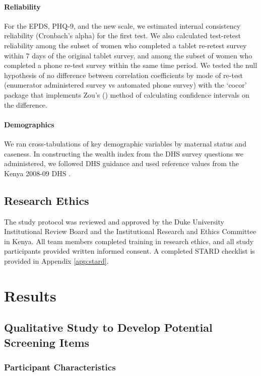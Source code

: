 \documentclass[man,natbib,longtable]{apa6}\usepackage[]{graphicx}\usepackage[]{color}
\begin{document}
\paragraph{Reliability}

For the EPDS, PHQ-9, and the new scale, we estimated internal consistency reliability (Cronbach's alpha) for the first test. We also calculated test-retest reliability among the subset of women who completed a tablet re-retest survey within 7 days of the original tablet survey, and among the subset of women who completed a phone re-test survey within the same time period. We tested the null hypothesis of no difference between correlation coefficients by mode of re-test (enumerator administered survey vs automated phone survey) with the `cocor' \citep{Diedenhofen:2015} package that implements Zou's (\citeyear{Zou:2007}) method of calculating confidence intervals on the difference.

\paragraph{Demographics}

We ran cross-tabulations of key demographic variables by maternal status and caseness. In constructing the wealth index from the DHS survey questions we administered, we followed DHS guidance and used reference values from the Kenya 2008-09 DHS \citep{DHSWI}.

\subsection{Research Ethics}

The study protocol was reviewed and approved by the Duke University Institutional Review Board and the Institutional Research and Ethics Committee in Kenya. All team members completed training in research ethics, and all study participants provided written informed consent. A completed STARD checklist is provided in Appendix \ref{app:stard}.

\section{Results}

\subsection{Qualitative Study to Develop Potential Screening Items}

\subsubsection{Participant Characteristics}
\end{document}
